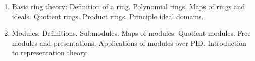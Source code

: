 \documentclass[margin,line]{res}
\newenvironment{list2}{
  \begin{list}{$\bullet$}{%
      \setlength{\itemsep}{0in}
      \setlength{\parsep}{0in} \setlength{\parskip}{0in}
      \setlength{\topsep}{0in} \setlength{\partopsep}{0in}
      \setlength{\leftmargin}{0.2in}}}{\end{list}}
\begin{document}
\begin{resume}
\begin{enumerate}
\item Basic ring theory: Definition of a ring. Polynomial rings. Maps of rings and ideals. Quotient rings. Product rings. Principle ideal domains.
\item Modules: Definitions. Submodules. Maps of modules. Quotient modules. Free modules and presentations. Applications of modules over PID. Introduction to representation theory.

\end{enumerate}
\end{resume}
\end{document}
